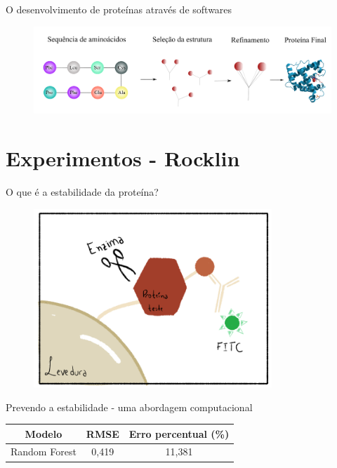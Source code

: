 \documentclass[10pt]{beamer}
\begin{document}
\begin{frame}{O desenvolvimento de proteínas através de softwares}
    \begin{figure}
        \centering
        \includegraphics[width=1.0\textwidth]{images/computationalprotein.pdf}
    \end{figure} 
\end{frame}

\section{Experimentos - Rocklin}

\begin{frame}{O que é a estabilidade da proteína?} 
   \begin{figure}
        \centering
        \includegraphics[width=0.8\textwidth]{../images/yeast_cell.png}
    \end{figure} 
\end{frame}

\begin{frame}{Prevendo a estabilidade - uma abordagem computacional}
  \begin{table}
      \begin{tabular}{@{}ccc@{}}
      \toprule
      Modelo          & RMSE & Erro percentual (\%) \\ \midrule
      Random Forest & 0,419         & 11,381          \\ \bottomrule
      \end{tabular}
      \label{tab:rocklin}
  \end{table}
\end{frame}
\end{document}
